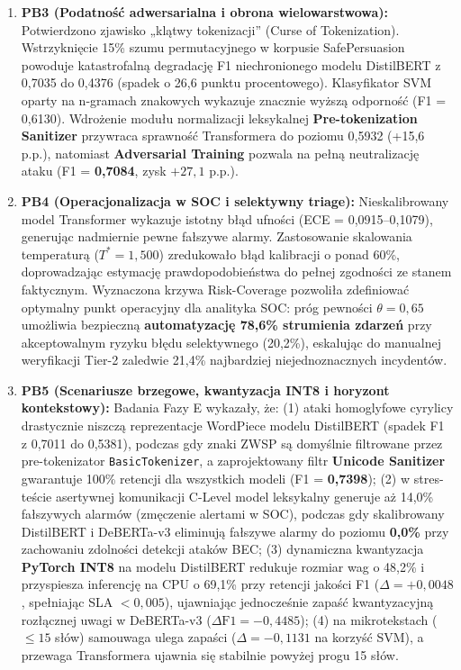 \documentclass[12pt,a4paper,twoside]{report}
\begin{document}
\begin{enumerate}[leftmargin=1.5em]
  \item \textbf{PB3 (Podatność adwersarialna i obrona wielowarstwowa):} Potwierdzono zjawisko „klątwy tokenizacji” (Curse of Tokenization). Wstrzyknięcie 15\% szumu permutacyjnego w korpusie SafePersuasion powoduje katastrofalną degradację F1 niechronionego modelu DistilBERT z 0,7035 do 0,4376 (spadek o 26,6 punktu procentowego). Klasyfikator SVM oparty na n-gramach znakowych wykazuje znacznie wyższą odporność (F1 = 0,6130). Wdrożenie modułu normalizacji leksykalnej \textbf{Pre-tokenization Sanitizer} przywraca sprawność Transformera do poziomu 0,5932 (+15,6 p.p.), natomiast \textbf{Adversarial Training} pozwala na pełną neutralizację ataku (F1 = \textbf{0,7084}, zysk $+27,1$ p.p.).

  \item \textbf{PB4 (Operacjonalizacja w SOC i selektywny triage):} Nieskalibrowany model Transformer wykazuje istotny błąd ufności (ECE = 0,0915--0,1079), generując nadmiernie pewne fałszywe alarmy. Zastosowanie skalowania temperaturą ($T^* = 1,500$) zredukowało błąd kalibracji o ponad 60\%, doprowadzając estymację prawdopodobieństwa do pełnej zgodności ze stanem faktycznym. Wyznaczona krzywa Risk-Coverage pozwoliła zdefiniować optymalny punkt operacyjny dla analityka SOC: próg pewności $\theta = 0,65$ umożliwia bezpieczną \textbf{automatyzację 78,6\% strumienia zdarzeń} przy akceptowalnym ryzyku błędu selektywnego (20,2\%), eskalując do manualnej weryfikacji Tier-2 zaledwie 21,4\% najbardziej niejednoznacznych incydentów.

  \item \textbf{PB5 (Scenariusze brzegowe, kwantyzacja INT8 i horyzont kontekstowy):} Badania Fazy E wykazały, że: (1) ataki homoglyfowe cyrylicy drastycznie niszczą reprezentacje WordPiece modelu DistilBERT (spadek F1 z 0,7011 do 0,5381), podczas gdy znaki ZWSP są domyślnie filtrowane przez pre-tokenizator \texttt{BasicTokenizer}, a zaprojektowany filtr \textbf{Unicode Sanitizer} gwarantuje 100\% retencji dla wszystkich modeli (F1 = \textbf{0,7398}); (2) w stres-teście asertywnej komunikacji C-Level model leksykalny generuje aż 14,0\% fałszywych alarmów (zmęczenie alertami w SOC), podczas gdy skalibrowany DistilBERT i DeBERTa-v3 eliminują fałszywe alarmy do poziomu \textbf{0,0\%} przy zachowaniu zdolności detekcji ataków BEC; (3) dynamiczna kwantyzacja \textbf{PyTorch INT8} na modelu DistilBERT redukuje rozmiar wag o 48,2\% i przyspiesza inferencję na CPU o 69,1\% przy retencji jakości F1 ($\Delta = +0,0048$, spełniając SLA $<0,005$), ujawniając jednocześnie zapaść kwantyzacyjną rozłącznej uwagi w DeBERTa-v3 ($\Delta\text{F1} = -0,4485$); (4) na mikrotekstach ($\le 15$ słów) samouwaga ulega zapaści ($\Delta = -0,1131$ na korzyść SVM), a przewaga Transformera ujawnia się stabilnie powyżej progu 15 słów.
\end{enumerate}
\end{document}
